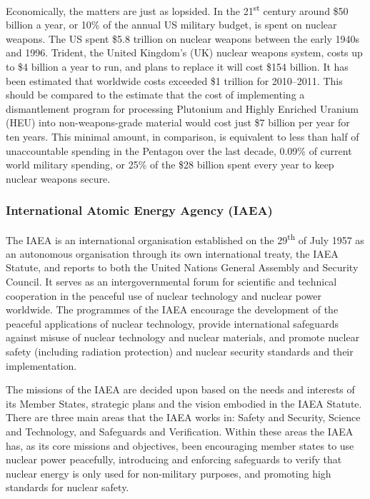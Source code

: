 \documentclass[twoside,titlepage,11pt,twocolumn,a4paper]{article}
\begin{document}
Economically, the matters are just as lopsided. In the
21\textsuperscript{st} century around \$50 billion a year, or 10\%
of the annual US military budget, is spent on nuclear
weapons. \citep{USspending} The US spent \$5.8 trillion on nuclear
weapons between the early 1940s and 1996. Trident, the United
Kingdom's (UK) nuclear weapons system, costs up to \$4 billion a
year to run, and plans to replace it will cost \$154 billion. It has
been estimated that worldwide costs exceeded \$1 trillion for
2010--2011. \citep{worldSpending} This should be compared to the
estimate that the cost of implementing a dismantlement program for
processing Plutonium and Highly Enriched Uranium (HEU) into
non-weapons-grade material would cost just \$7 billion per year for
ten years. \citep{worldSafe} This minimal amount, in comparison, is
equivalent to less than half of unaccountable spending in the Pentagon
over the last decade, 0.09\% of current world military spending, or
25\% of the \$28 billion spent every year to keep nuclear weapons
secure.

\subsubsection{International Atomic Energy Agency (IAEA)}
The IAEA is an international organisation established on the
29\textsuperscript{th} of July 1957 as an autonomous organisation
through its own international treaty, the IAEA Statute, and reports to
both the United Nations General Assembly and Security Council. It
serves as an intergovernmental forum for scientific and technical
cooperation in the peaceful use of nuclear technology and nuclear
power worldwide. The programmes of the IAEA encourage the development
of the peaceful applications of nuclear technology, provide
international safeguards against misuse of nuclear technology and
nuclear materials, and promote nuclear safety (including radiation
protection) and nuclear security standards and their implementation.

The missions of the IAEA are decided upon based on the needs and
interests of its Member States, strategic plans and the vision
embodied in the IAEA Statute. There are three main areas that the IAEA
works in: Safety and Security, Science and Technology, and Safeguards
and Verification. Within these areas the IAEA has, as its core
missions and objectives, been encouraging member states to use nuclear
power peacefully, introducing and enforcing safeguards to verify that
nuclear energy is only used for non-military purposes, and promoting
high standards for nuclear safety.
\end{document}
